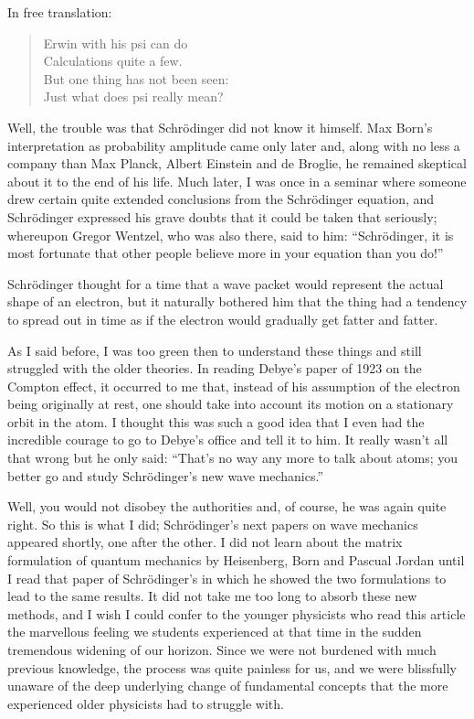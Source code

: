 \documentclass[12pt]{article}
\begin{document}
\noindent
In free translation:

\begin{quote}
Erwin with his psi can do\\
Calculations quite a few.\\
But one thing has not been seen:\\
Just what does psi really mean?
\end{quote}

Well, the trouble was that Schr\"odinger did not know it himself. Max Born's interpretation as probability amplitude came only later and, along with no less a company than Max Planck, Albert Einstein and de Broglie, he remained skeptical about it to the end of his life. Much later, I was once in a seminar where someone drew certain quite extended conclusions from the Schr\"odinger equation, and Schr\"odinger expressed his grave doubts that it could be taken that seriously; whereupon Gregor Wentzel, who was also there, said to him: ``Schr\"odinger, it is most fortunate that other people believe more in your equation than you do!''

Schr\"odinger thought for a time that a wave packet would represent the actual shape of an electron, but it naturally bothered him that the thing had a tendency to spread out in time as if the electron would gradually get fatter and fatter.

As I said before, I was too green then to understand these things and still struggled with the older theories. In reading Debye's paper of 1923 on the Compton effect, it occurred to me that, instead of
his assumption of the electron being originally at rest, one should take into account its motion on a stationary orbit in the atom. I thought this was such a good idea that I even had the incredible courage to go to Debye's office and tell it to him. It really wasn't all that wrong but he only said: ``That's no way any more to talk about atoms; you better go and study Schr\"odinger's new wave mechanics.''

Well, you would not disobey the authorities and, of course, he was again quite right. So this is what I did; Schr\"odinger's next papers on wave mechanics appeared shortly, one after the other. I did not learn about the matrix formulation of quantum mechanics by Heisenberg, Born and Pascual Jordan until I read that paper of Schr\"odinger's in which he showed the two formulations to lead to the same results. It did not take me too long to absorb these new methods, and I wish I could confer to the younger physicists who read this article the marvellous feeling we students experienced at that time in the sudden tremendous widening of our horizon. Since we were not burdened with much previous knowledge, the process was quite painless for us, and we were blissfully unaware of the deep underlying change of fundamental concepts that the more experienced older physicists had to struggle with.
\end{document}
